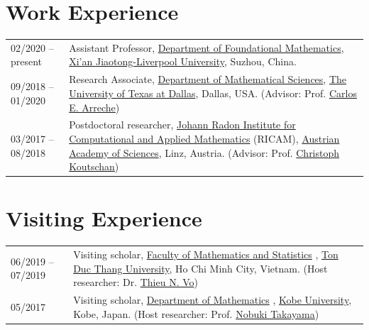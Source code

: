 \documentclass[a4paper,12pt]{article}
\begin{document}
\section*{\Large{Work Experience}}
\begin{tabular}{@{}p{1.4in}p{4in}}
02/2020 --   present              & Assistant Professor, \href{https://www.xjtlu.edu.cn/en/study/departments/academic-departments/foundational-mathematics/}{Department of Foundational Mathematics}, \href{https://www.xjtlu.edu.cn/en/}{Xi'an Jiaotong-Liverpool University}, Suzhou, China. \\
09/2018 -- 01/2020    & Research Associate, \href{https://www.utdallas.edu/math/}{Department of Mathematical Sciences}, 
                        \href{https://www.utdallas.edu/}{The University of Texas at Dallas}, Dallas, USA. 
                        (Advisor: Prof. \href{https://www.utdallas.edu/~arreche/}{Carlos E. Arreche}) \\    
03/2017 -- 08/2018    & Postdoctoral researcher, 
                        \href{https://www.ricam.oeaw.ac.at/}{Johann Radon Institute for Computational and Applied Mathematics} (RICAM),
                        \href{http://www.oeaw.ac.at/en/austrian-academy-of-sciences/}{Austrian Academy of Sciences}, Linz, Austria. 
                        (Advisor: Prof. \href{http://www.koutschan.de/}{Christoph Koutschan})\\
\end{tabular}

\section*{\Large{Visiting Experience}}
\begin{tabular}{@{}p{1.4in}p{4.5in}}
06/2019 -- 07/2019               & Visiting scholar, 
                        \href{https://fms.tdtu.edu.vn/}{Faculty of Mathematics and Statistics} ,
                        \href{https://tdtu.edu.vn/}{Ton Duc Thang University}, Ho Chi Minh City, Vietnam. 
                        (Host researcher: Dr. \href{https://sites.google.com/tdtu.edu.vn/vongocthieu}{Thieu N. Vo})\\
05/2017               & Visiting scholar, 
                        \href{http://www.math.kobe-u.ac.jp/}{Department of Mathematics} ,
                        \href{http://www.kobe-u.ac.jp/en/}{Kobe University}, Kobe, Japan. 
                        (Host researcher: Prof. \href{http://www.math.kobe-u.ac.jp/home-j/takayama-e.html}{Nobuki Takayama})\\
\end{tabular}
\end{document}
